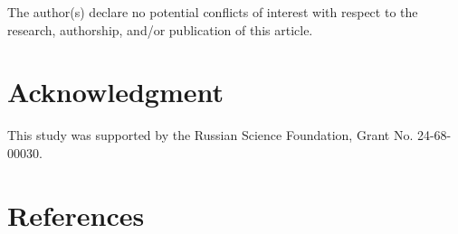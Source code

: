 \documentclass[10pt]{iopart}
\begin{document}
The author(s) declare no potential conflicts of interest with respect to the research, authorship, and/or publication of this article.

\section*{Acknowledgment}

This study was supported by the Russian Science Foundation, Grant No. 24-68-00030.

\section*{References}

{}

\end{document}

